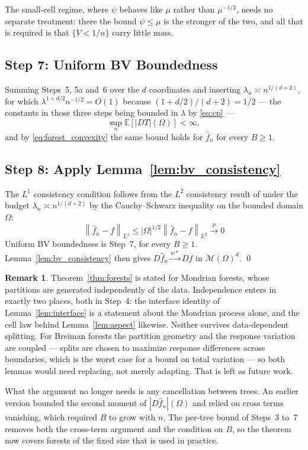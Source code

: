 \documentclass[12pt,a4paper]{article}
\numberwithin{equation}{section}
\theoremstyle{plain}
\theoremstyle{definition}
\newtheorem{remark}{Remark}
\newcommand{\norm}[1]{\left\| #1 \right\|}
\newcommand{\E}{\mathbb{E}}
\newcommand{\cM}{\mathcal{M}(\Omega)^d}
\newcommand{\fn}{\hat{f}_n}
\newcommand{\xrightarrowp}{\xrightarrow{p}}
\begin{document}
	The small-cell regime, where $\psi$ behaves like $\mu$ rather than
	$\mu^{-1/2}$, needs no separate treatment: there the bound $\psi \leq \mu$ is
	the stronger of the two, and all that is required is that $\{V < 1/n\}$ carry
	little mass.

	\subsection{Step 7: Uniform BV Boundedness}

	Summing Steps~5, 5a and~6 over the $d$ coordinates and inserting
	$\lambda_n \asymp n^{1/(d+2)}$, for which
	$\lambda^{1+d/2}n^{-1/2} = O(1)$ because $(1 + d/2)/(d+2) = 1/2$ --- the
	constants in those three steps being bounded in $\lambda$ by
	\eqref{eq:cp} ---
	\begin{equation}
		\sup_n \E\!\left[|DT|(\Omega)\right] < \infty ,
	\end{equation}
	and by \eqref{eq:forest_convexity} the same bound holds for $\fn$ for every
	$B \geq 1$.

	\subsection{Step 8: Apply Lemma~\ref{lem:bv_consistency}}
	
	The $L^1$ consistency condition follows from the $L^2$ consistency result of
	\citet{mourtada2017mondrian} under the budget $\lambda_n \asymp n^{1/(d+2)}$
	by the Cauchy--Schwarz inequality on the bounded domain $\Omega$:
	\begin{equation}
		\norm{\fn - f}_{L^1}
		\leq |\Omega|^{1/2} \norm{\fn - f}_{L^2}
		\xrightarrowp 0
	\end{equation}
	Uniform BV boundedness is Step~7, for every $B \geq 1$.
	Lemma~\ref{lem:bv_consistency} then gives
	$D\fn \xrightarrow{w*} Df$ in $\cM$. \qed
	
	\begin{remark}
		Theorem~\ref{thm:forests} is stated for Mondrian forests, whose
		partitions are generated independently of the data. Independence enters
		in exactly two places, both in Step~4: the interface identity of
		Lemma~\ref{lem:interface} is a statement about the Mondrian process
		alone, and the cell law behind Lemma~\ref{lem:aspect} likewise. Neither
		survives data-dependent splitting. For Breiman forests the partition
		geometry and the response variation are coupled --- splits are chosen to
		maximize response differences across boundaries, which is the worst case
		for a bound on total variation --- so both lemmas would need replacing,
		not merely adapting. That is left as future work.

		What the argument no longer needs is any cancellation between trees.
		An earlier version bounded the second moment of $|D\fn|(\Omega)$ and
		relied on cross terms vanishing, which required $B$ to grow with $n$.
		The per-tree bound of Steps~3 to~7 removes both the cross-term argument
		and the condition on $B$, so the theorem now covers forests of the fixed
		size that is used in practice.
	\end{remark}
	



\end{document}
